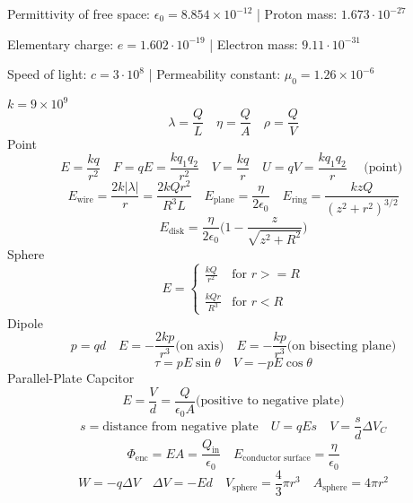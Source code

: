 \documentclass[8pt,twocolumn]{extarticle}
\begin{document}
Permittivity of free space: $\epsilon_0 = 8.854\times 10^{-12}$ |
Proton mass: $1.673\cdot 10^{-27}$

Elementary charge: $e = 1.602\cdot 10^{-19}$ |
Electron mass: $9.11\cdot 10^{-31}$

Speed of light: $c=3\cdot 10^8$ |
Permeability constant: $\mu_0 = 1.26\times 10^{-6}$

$k=9\times 10^9$
\[\lambda = \frac{Q}{L}\quad\eta = \frac{Q}{A}\quad\rho = \frac{Q}{V}\]
Point
\[E=\frac{kq}{r^2}\quad F=qE=\frac{kq_1 q_2}{r^2}\quad V=\frac{kq}{r}\quad U=qV=\frac{kq_1 q_2}{r}\quad\text{ (point) }\]
\[E_\text{wire}=\frac{2k|\lambda |}{r}=\frac{2kQ r^2}{R^3 L}\quad E_\text{plane}=\frac{\eta}{2\epsilon_0}\quad E_\text{ring}=\frac{kzQ}{{(z^2 + r^2)}^{3/2}}\]
\[E_\text{disk}=\frac{\eta}{2\epsilon_0}\Big(1-\frac{z}{\sqrt{z^2 + R^2}}\Big)\]
Sphere
\[E=\begin{cases}
    \frac{kQ}{r^2} & \text{for } r >= R \\ \\
    \frac{kQr}{R^3} & \text{for } r < R
\end{cases}\]
Dipole
\[p=qd\quad E=-\frac{2kp}{r^3}\text{(on axis)}\quad E=-\frac{kp}{r^3}\text{(on bisecting plane)}\]
\[\tau = pE\sin\theta\quad V = -pE\cos\theta\]
Parallel-Plate Capcitor
\[E=\frac{V}{d}=\frac{Q}{\epsilon_0 A}\text{(positive to negative plate)}\]
\[s=\text{distance from negative plate}\quad U=qEs\quad V=\frac{s}{d}\Delta V_C\]
\[\Phi_\text{enc}=EA=\frac{Q_\text{in}}{\epsilon_0}\quad E_\text{conductor surface}=\frac{\eta}{\epsilon_0}\]
\[W=-q\Delta V\quad \Delta V = -Ed\quad V_\text{sphere} = \frac{4}{3}\pi r^3\quad A_\text{sphere}=4\pi r^2\]
\end{document}
